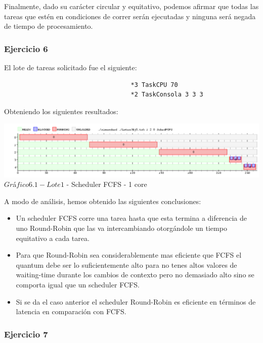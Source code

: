 \indent Finalmente, dado su carácter circular y equitativo, podemos afirmar que todas las tareas que 
estén en condiciones de correr serán ejecutadas y ninguna será negada de tiempo de procesamiento.\\


\subsubsection[Resolución Ejercicio 6]{Ejercicio 6}

El lote de tareas solicitado fue el siguiente:
\begin{verbatim}
                                   *3 TaskCPU 70
                                   *2 TaskConsola 3 3 3
\end{verbatim}

Obteniendo los siguientes resultados:

\begin{center}
  	\includegraphics[width=450pt]{ej6.png}
	  {$Gr$\'a$fico 6.1 - Lote 1$ - Scheduler FCFS - 1 core}	
\end{center}

\indent A modo de an\'alisis, hemos obtenido las siguientes conclusiones:\\


\begin{itemize}
 \item Un scheduler FCFS corre una tarea hasta que esta termina a diferencia de uno Round-Robin 
que las va intercambiando otorg\'{a}ndole un tiempo equitativo a cada tarea.
\item Para que Round-Robin sea considerablemente mas eficiente que FCFS el quantum debe ser 
lo suficientemente alto para no tenes altos valores de waiting-time durante los cambios de 
contexto pero no demasiado alto sino se comporta igual que un scheduler FCFS.
\item Si se da el caso anterior el scheduler Round-Robin es eficiente en t\'{e}rminos 
de latencia en comparaci\'{o}n con FCFS.
\end{itemize}


\subsubsection[Resolución Ejercicio 7]{Ejercicio 7}

